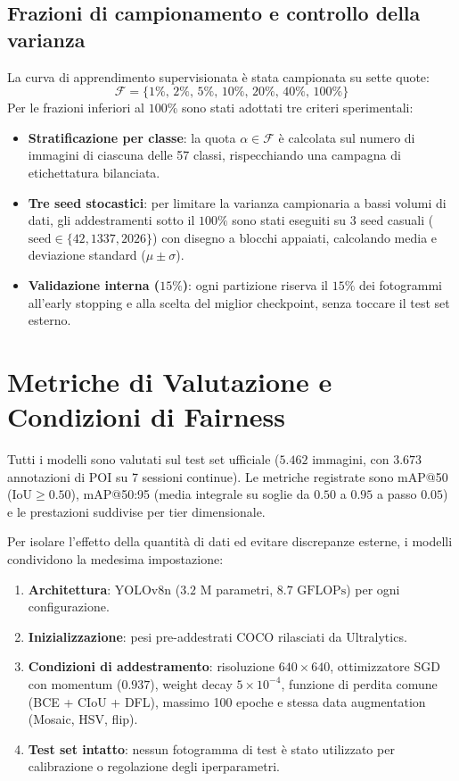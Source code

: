 \subsection{Frazioni di campionamento e controllo della varianza}
La curva di apprendimento supervisionata è stata campionata su sette quote:
\begin{equation}
    \mathcal{F} = \{1\%, \, 2\%, \, 5\%, \, 10\%, \, 20\%, \, 40\%, \, 100\%\}
\end{equation}
Per le frazioni inferiori al $100\%$ sono stati adottati tre criteri sperimentali:
\begin{itemize}
    \item \textbf{Stratificazione per classe}: la quota $\alpha \in \mathcal{F}$ è calcolata sul numero di immagini di ciascuna delle 57 classi, rispecchiando una campagna di etichettatura bilanciata.
    \item \textbf{Tre seed stocastici}: per limitare la varianza campionaria a bassi volumi di dati, gli addestramenti sotto il $100\%$ sono stati eseguiti su 3 seed casuali ($\text{seed} \in \{42, 1337, 2026\}$) con disegno a blocchi appaiati, calcolando media e deviazione standard ($\mu \pm \sigma$).
    \item \textbf{Validazione interna ($15\%$)}: ogni partizione riserva il $15\%$ dei fotogrammi all'early stopping e alla scelta del miglior checkpoint, senza toccare il test set esterno.
\end{itemize}

\section{Metriche di Valutazione e Condizioni di Fairness}
\label{sec:sample_metriche}
Tutti i modelli sono valutati sul test set ufficiale ($5.462$ immagini, con $3.673$ annotazioni di POI su 7 sessioni continue). Le metriche registrate sono mAP@50 ($\text{IoU} \ge 0.50$), mAP@50:95 (media integrale su soglie da $0.50$ a $0.95$ a passo $0.05$) e le prestazioni suddivise per tier dimensionale.

Per isolare l'effetto della quantità di dati ed evitare discrepanze esterne, i modelli condividono la medesima impostazione:
\begin{enumerate}
    \item \textbf{Architettura}: YOLOv8n ($3.2\text{ M}$ parametri, $8.7\text{ GFLOPs}$) per ogni configurazione.
    \item \textbf{Inizializzazione}: pesi pre-addestrati COCO rilasciati da Ultralytics.
    \item \textbf{Condizioni di addestramento}: risoluzione $640 \times 640$, ottimizzatore SGD con momentum ($0.937$), weight decay $5 \times 10^{-4}$, funzione di perdita comune (BCE + CIoU + DFL), massimo 100 epoche e stessa data augmentation (Mosaic, HSV, flip).
    \item \textbf{Test set intatto}: nessun fotogramma di test è stato utilizzato per calibrazione o regolazione degli iperparametri.
\end{enumerate}

